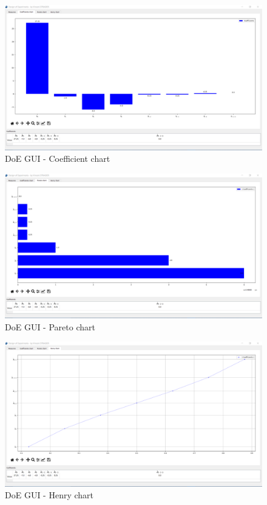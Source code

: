 \documentclass[english, 12 pt, openany, oneside]{book}
\begin{document}
\begin{figure}[!ht]
\centering
\includegraphics[width=\linewidth]{doe_gui_coef}
\caption{DoE GUI - Coefficient chart\label{fig:doe_gui_coef}}
\end{figure}

\begin{figure}[!ht]
\centering
\includegraphics[width=\linewidth]{doe_gui_pareto}
\caption{DoE GUI - Pareto chart\label{fig:doe_gui_pareto}}
\end{figure}

\begin{figure}[!ht]
\centering
\includegraphics[width=\linewidth]{doe_gui_henry}
\caption{DoE GUI - Henry chart\label{fig:doe_gui_henry}}
\end{figure}
\end{document}
